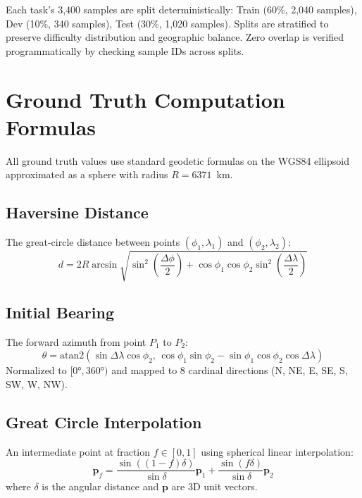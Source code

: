 Each task's 3,400 samples are split deterministically: Train (60\%, 2,040 samples), Dev (10\%, 340 samples), Test (30\%, 1,020 samples). Splits are stratified to preserve difficulty distribution and geographic balance. Zero overlap is verified programmatically by checking sample IDs across splits.

\section{Ground Truth Computation Formulas}
\label{app:ground_truth_formulas}

All ground truth values use standard geodetic formulas on the WGS84 ellipsoid approximated as a sphere with radius $R = 6371$~km.

\subsection{Haversine Distance}
The great-circle distance between points $(\phi_1, \lambda_1)$ and $(\phi_2, \lambda_2)$:
\begin{equation}
d = 2R \arcsin\sqrt{\sin^2\!\left(\frac{\Delta\phi}{2}\right) + \cos\phi_1 \cos\phi_2 \sin^2\!\left(\frac{\Delta\lambda}{2}\right)}
\end{equation}

\subsection{Initial Bearing}
The forward azimuth from point $P_1$ to $P_2$:
\begin{equation}
\theta = \text{atan2}\left(\sin\Delta\lambda \cos\phi_2,\, \cos\phi_1 \sin\phi_2 - \sin\phi_1 \cos\phi_2 \cos\Delta\lambda\right)
\end{equation}
Normalized to $[0°, 360°)$ and mapped to 8 cardinal directions (N, NE, E, SE, S, SW, W, NW).

\subsection{Great Circle Interpolation}
An intermediate point at fraction $f \in [0,1]$ using spherical linear interpolation:
\begin{equation}
\mathbf{p}_f = \frac{\sin((1-f)\delta)}{\sin\delta} \mathbf{p}_1 + \frac{\sin(f\delta)}{\sin\delta} \mathbf{p}_2
\end{equation}
where $\delta$ is the angular distance and $\mathbf{p}$ are 3D unit vectors.

